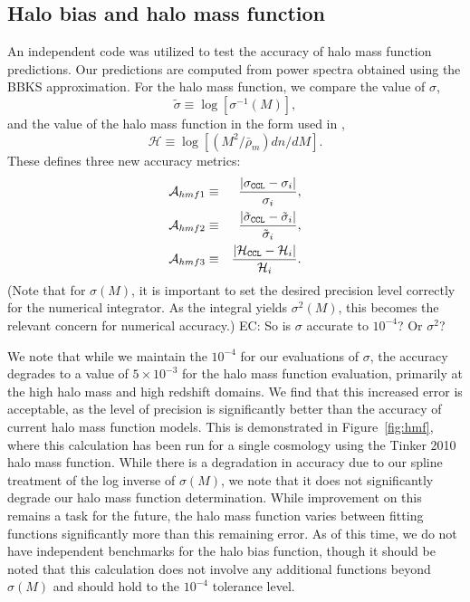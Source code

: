 \documentclass[\docopts]{\docclass}
\newcommand{\elisa}[1]{\textcolor{green!10!orange!90!}{EC: #1}}
\begin{document}
\subsection{Halo bias and halo mass function}

An independent code was utilized to test the accuracy of halo mass function predictions. Our predictions are computed from power spectra obtained using the BBKS approximation. For the halo mass function, we compare the value of $\sigma$,
\begin{equation}
  \tilde\sigma\equiv\log[\sigma^{-1}(M)],\label{eq:tildesig}
\end{equation}
and the value of the halo mass function in the form used in \citet{Tinker2008},
\begin{equation}
  \mathcal{H}\equiv \log[(M^2/\bar{\rho}_m)dn/dM].
  \label{eq:newhmf}
\end{equation}
These defines three new accuracy metrics:
\begin{eqnarray}
  \mathcal{A}_{hmf1}&\equiv&\frac{|\sigma_{\tt CCL}-\sigma_i|}{\sigma_i},\\
  \mathcal{A}_{hmf2}&\equiv&\frac{|\tilde\sigma_{\tt CCL}-\tilde\sigma_i|}{\tilde\sigma_i},\\
  \mathcal{A}_{hmf3}&\equiv&\frac{|\mathcal{H}_{\tt CCL}-\mathcal{H}_i|}{\mathcal{H}_i}.
\end{eqnarray}
(Note that for $\sigma(M)$, it is important to set the desired precision level correctly for the numerical integrator. As the integral yields $\sigma^2(M)$, this becomes the relevant concern for numerical accuracy.) \elisa{So is $\sigma$ accurate to $10^{-4}$? Or $\sigma^2$?}

We note that while we maintain the $10^{-4}$ for our evaluations of $\sigma$, the accuracy degrades to a value of $5\times10^{-3}$ for the halo mass function evaluation, primarily at the high halo mass and high redshift domains. We find that this increased error is acceptable, as the level of precision is significantly better than the accuracy of current halo mass function models. This is demonstrated in Figure~\ref{fig:hmf}, where this calculation has been run for a single cosmology using the Tinker 2010 halo mass function. While there is a degradation in accuracy due to our spline treatment of the log inverse of $\sigma(M)$, we note that it does not significantly degrade our halo mass function determination. While improvement on this remains a task for the future, the halo mass function varies between fitting functions significantly more than this remaining error. As of this time, we do not have independent benchmarks for the halo bias function, though it should be noted that this calculation does not involve any additional functions beyond $\sigma(M)$ and should hold to the $10^{-4}$ tolerance level.
\end{document}
